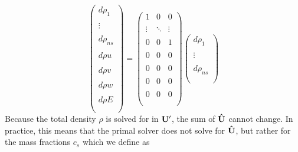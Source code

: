 \documentclass{article}   	%
\begin{document}
\begin{equation}
  \begin{pmatrix}
 		d \rho_1    \\ \\
		  \vdots    \\ \\
		d \rho_{ns} \\ \\
		d \rho u    \\ \\
		d \rho v    \\ \\
		d \rho w    \\ \\
		d \rho E    \\ \\
	\end{pmatrix} =
  \begin{pmatrix}
    1      &    0    & 0      \\ \\
    \vdots & \ddots  & \vdots \\ \\
    0      &    0    & 1      \\ \\
    0      &    0    & 0      \\ \\
    0      &    0    & 0      \\ \\
    0      &    0    & 0      \\ \\
    0      &    0    & 0      \\ \\
  \end{pmatrix}
  \begin{pmatrix}
 		d \rho_1    \\ \\
 		\vdots      \\ \\
    d \rho_{ns} \\ \\
	\end{pmatrix}
  \label{q-map2}
\end{equation}
Because the total density $\rho$ is solved for in $\mathbf{U}'$, the sum of $\mathbf{\hat{U}}$
cannot change.  In practice, this means that the primal solver does not solve
for $\mathbf{\hat{U}}$, but rather for the mass fractions $c_s$ which we define as
\end{document}
